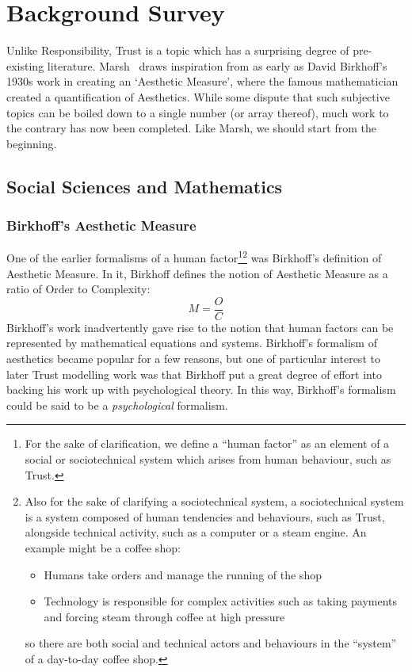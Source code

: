 \section{Background Survey}\label{sec:background_survey}

Unlike Responsibility, Trust is a topic which has a surprising degree of pre-existing literature. Marsh~\cite{Marsh1994FormalisingConcept} draws inspiration from as early as David Birkhoff's 1930s work in creating an `Aesthetic Measure', where the famous mathematician created a quantification of Aesthetics. While some dispute that such subjective topics can be boiled down to a single number (or array thereof), much work to the contrary has now been completed. Like Marsh, we should start from the beginning. 

\subsection{Social Sciences and Mathematics}
\subsubsection{Birkhoff's Aesthetic Measure}
One of the earlier formalisms of a human factor\footnote{For the sake of clarification, we define a ``human factor'' as an element of a social or sociotechnical system which arises from human behaviour, such as Trust.}\footnote{Also for the sake of clarifying a sociotechnical system, a sociotechnical system is a system composed of human tendencies and behaviours, such as Trust, alongside technical activity, such as a computer or a steam engine. An example might be a coffee shop: \begin{itemize}
    \item Humans take orders and manage the running of the shop
    \item Technology is responsible for complex activities such as taking payments and forcing steam through coffee at high pressure
\end{itemize} so there are both social and technical actors and behaviours in the ``system'' of a day-to-day coffee shop.} was Birkhoff's definition of Aesthetic Measure\cite{BirkhoffAESTHETICMEASURE}. In it, Birkhoff defines the notion of Aesthetic Measure as a ratio of Order to Complexity:
\[M = \frac{O}{C}\]
Birkhoff's work inadvertently gave rise to the notion that human factors can be represented by mathematical equations and systems. Birkhoff's formalism of aesthetics became popular for a few reasons, but one of particular interest to later Trust modelling work was that Birkhoff put a great degree of effort into backing his work up with psychological theory. In this way, Birkhoff's formalism could be said to be a \emph{psychological} formalism. \par

